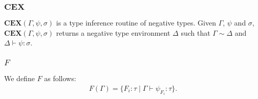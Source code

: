 \documentclass[runningheads]{llncs}
\newcommand\COL{\mathbin{:}}
\newcommand \stypeint {\textbf{Int}}
\newcommand \stypebool {\bullet}
\newcommand \stypeboolf {\circ}
\newcommand \typeint[1]{{#1} : \stypeint}
\newcommand \typebool[1]{\stypebool \langle #1 \rangle}
\newcommand \typeboolf[1]{\stypeboolf \langle #1 \rangle}
\newcommand {\rconflict} {\emph{Conflict}}
\newcommand {\fenv} {\Delta} %
\newcommand {\conflict}{\not \sim}
\newcommand {\consistent}{\sim}
\newcommand {\intersect} {\land}
\newcommand {\dual}[1]{\overline{#1}}
\begin{document}
\subsubsection{\( \mathbf{CEX} \)}

\( \textbf{CEX}(\Gamma, \psi, \sigma) \) is a type inference routine of negative types.
Given \( \Gamma \), \( \psi \) and \( \sigma \),
\( \textbf{CEX}(\Gamma, \psi, \sigma) \) returns a negative type environment \( \fenv \) such that
\( \Gamma \sim \fenv \) and \( \fenv \vdash \psi \COL \sigma \).

\subsubsection{\( F\)}

We define \( F \) as follows:
\begin{align*}
    F(\Gamma) = \{ F_i \COL \tau \mid
        \Gamma \vdash \psi_{F_i} \COL \tau \}.
\end{align*}

%
%
%
%
%
%
\end{document}
